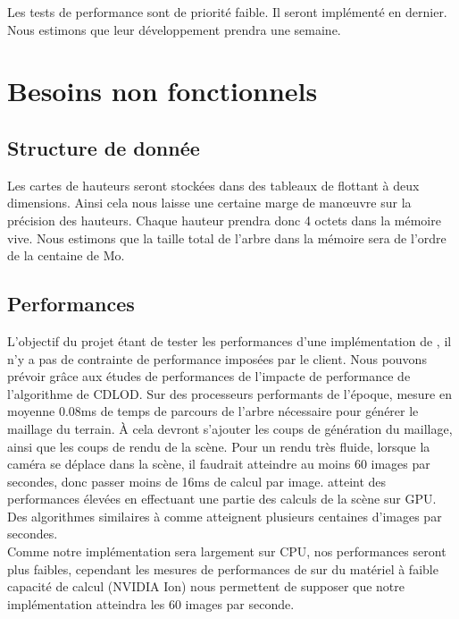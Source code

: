 \documentclass[12pt]{report}
\begin{document}
Les tests de performance sont de priorité faible. Il seront implémenté
en dernier. Nous estimons que leur développement prendra une semaine.\\


\newpage
\section{Besoins non fonctionnels}

\subsection{Structure de donnée}

Les cartes de hauteurs seront stockées dans des tableaux de flottant à
deux dimensions. Ainsi cela nous laisse une certaine marge de manœuvre
sur la précision des hauteurs. Chaque hauteur prendra donc 4 octets dans
la mémoire vive. Nous estimons que la taille total de l'arbre dans la
mémoire sera de l'ordre de la centaine de Mo.\\


\subsection{Performances}

L'objectif du projet étant de tester les performances d'une
implémentation de \cite{CDLOD}, il n'y a pas de contrainte de
performance imposées par le client. Nous pouvons prévoir grâce aux
études de performances de \cite{CDLOD} l'impacte de performance de
l'algorithme de CDLOD. Sur des processeurs performants de l'époque,
\cite{CDLOD} mesure en moyenne 0.08ms de temps de parcours de l'arbre
nécessaire pour générer le maillage du terrain. À cela devront s'ajouter
les coups de génération du maillage, ainsi que les coups de rendu de la
scène.  Pour un rendu très fluide, lorsque la caméra se
déplace dans la scène, il faudrait atteindre au moins 60 images par
secondes, donc passer moins de 16ms de calcul par image. \cite{CDLOD}
atteint des performances élevées en effectuant une partie des calculs de
la scène sur GPU.  Des algorithmes similaires à \cite{CDLOD} comme
\cite{PlanetRenderer} atteignent plusieurs centaines d'images par
secondes.\\
Comme notre implémentation sera largement sur CPU, nos
performances seront plus faibles, cependant les mesures de performances
de \cite{CDLOD} sur du matériel à faible capacité de calcul (NVIDIA Ion)
nous permettent de supposer que notre implémentation atteindra les 60
images par seconde.
\end{document}

